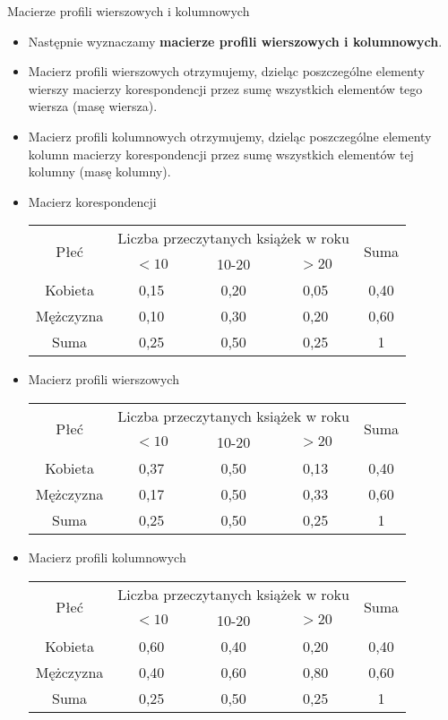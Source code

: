 \documentclass{beamer}
\begin{document}
\begin{frame}{Macierze profili wierszowych i kolumnowych}
  \begin{itemize}
  \item Następnie wyznaczamy \textbf{macierze profili wierszowych i kolumnowych}.
  \item Macierz profili wierszowych otrzymujemy, dzieląc poszczególne elementy wierszy macierzy korespondencji przez sumę wszystkich elementów tego wiersza (masę wiersza).
  \item Macierz profili kolumnowych otrzymujemy, dzieląc poszczególne elementy kolumn macierzy korespondencji przez sumę wszystkich elementów tej kolumny (masę kolumny).
  \end{itemize}
\end{frame}


\begin{frame}{}
  \begin{scriptsize}
    \begin{itemize}
\item<1->Macierz korespondencji
\begin{tabular}{|c|c|c|c|c|}\hline
\multirow{2}{*}{Płeć} & \multicolumn{3}{|c|}{Liczba przeczytanych książek w roku}& \multirow{2}{*}{Suma}\\
& $<10$ & 10-20 & $>20$ & \\ \hline
Kobieta & 0,15 & 0,20 & 0,05 & \color{blue} 0,40\\\hline
Mężczyzna & 0,10 & 0,30 & 0,20 & \color{blue}0,60\\\hline
Suma & \color{magenta} 0,25 & \color{magenta} 0,50 & \color{magenta} 0,25 & 1\\\hline
\end{tabular}

\item<2->Macierz {\color{blue} profili wierszowych}
\begin{tabular}{|c|c|c|c|c|}\hline
  \multirow{2}{*}{Płeć} & \multicolumn{3}{|c|}{Liczba przeczytanych książek w roku}& \multirow{2}{*}{Suma}\\
  & $<10$ & 10-20 & $>20$ & \\ \hline
Kobieta & 0,37 & 0,50 & 0,13 & 0,40\\\hline
Mężczyzna & 0,17 & 0,50 & 0,33 & 0,60\\\hline
Suma & 0,25 & 0,50 & 0,25 & 1\\\hline
\end{tabular}

\item<3->Macierz {\color{magenta} profili kolumnowych}
\begin{tabular}{|c|c|c|c|c|}\hline
  \multirow{2}{*}{Płeć} & \multicolumn{3}{|c|}{Liczba przeczytanych książek w roku}& \multirow{2}{*}{Suma}\\
  & $<10$ & 10-20 & $>20$ & \\ \hline
Kobieta & 0,60 & 0,40 & 0,20 & 0,40\\\hline
Mężczyzna & 0,40 & 0,60 & 0,80 & 0,60\\\hline
Suma & 0,25 & 0,50 & 0,25 & 1\\\hline
\end{tabular}



\end{itemize}
\end{scriptsize}
\end{frame}
\end{document}

